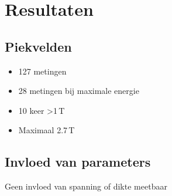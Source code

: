 \documentclass{beamer}
\newcommand{\includeGraph}[2]{
	\begin{center}
	\scalebox{#1}{
		
	}
	\end{center}
}
\begin{document}
\section{Resultaten}
\subsection{Piekvelden}
\begin{frame}
\begin{itemize}
\item 127 metingen
\item 28 metingen bij maximale energie
\item 10 keer \textgreater 1\,T
\item Maximaal 2.7\,T
\end{itemize}
\end{frame}

\subsection{Invloed van parameters}
\begin{frame}
Geen invloed van spanning of dikte meetbaar

\begin{columns}
\begin{column}{0.5\textwidth}
\includeGraph{0.7}{BvasteD}
\end{column}
\begin{column}{0.5\textwidth}
\includeGraph{0.7}{BvasteV}
\end{column}
\end{columns}

\end{frame}
\end{document}
